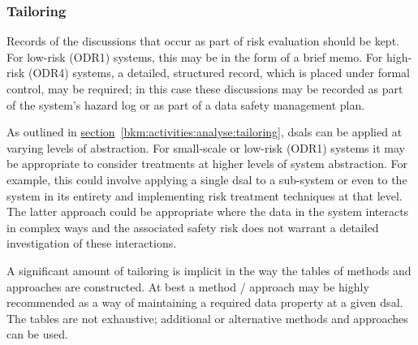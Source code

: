 \subsubsection{Tailoring}
\cbstart Records of the discussions that occur as part of risk evaluation should be kept\cbend. For low-risk (ODR1) systems, this may be in the form of a brief memo. \cbstart For high-risk (ODR4) systems, a detailed, structured record, which is placed under formal control, may be required\cbend; in this case these discussions may be recorded as part of the system's \gls{hazard log} or as part of a data safety management plan.

As outlined in
\hyperref[bkm:activities:analyse:tailoring]{section}~\ref{bkm:activities:analyse:tailoring}, %
\glspl{dsal} can be applied at varying levels of abstraction. For small-scale or low-risk (ODR1) systems it may be appropriate to consider \glspl{treatment} at higher levels of system abstraction. For example, this could involve applying a single \gls{dsal} to a sub-system or even to the system in its entirety and implementing risk \gls{treatment} techniques at that level. The latter approach could be appropriate where the data in the system interacts in complex ways and the associated safety risk does not warrant a detailed investigation of these interactions.

A significant amount of tailoring is implicit in the way the tables of methods and approaches are constructed. At best a method / approach may be highly recommended as a way of maintaining a required data property at a given \gls{dsal}. \cbstart The tables are not exhaustive; additional or alternative methods and approaches can be used\cbend.
